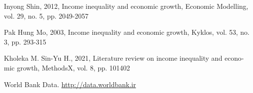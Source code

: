 
\begin{latin}
    \begin{thebibliography}{99}
    
    Inyong Shin, 2012, Income inequality and economic growth, Economic Modelling, vol. 29, no. 5, pp. 2049-2057

    Pak Hung Mo, 2003, Income inequality and economic growth, Kyklos, vol. 53, no. 3, pp. 293-315

    Kholeka M.  Sin-Yu H., 2021, Literature review on income inequality and economic growth, MethodsX, vol. 8, pp. 101402

    
    
    World Bank Data. \url{http://data.worldbank.ir}
    
    \end{thebibliography}
\end{latin}

% 